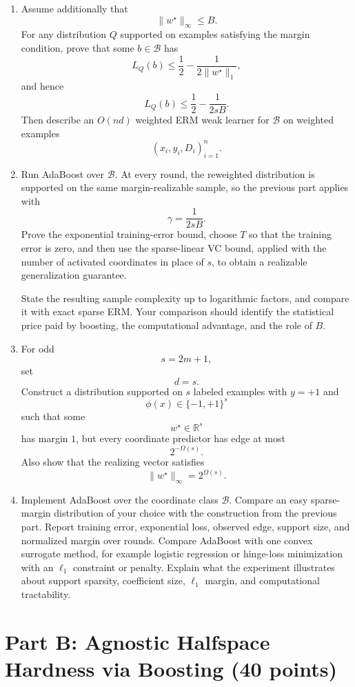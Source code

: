 \documentclass{article}
\begin{document}
\begin{enumerate}
\item Assume additionally that
$$
\|w^\star\|_\infty \le B.
$$
For any distribution $Q$ supported on examples satisfying the margin condition, prove that some $b\in\mathcal{B}$ has
$$
L_Q(b)\le \frac12-\frac{1}{2\|w^\star\|_1},
$$
and hence
$$
L_Q(b)\le \frac12-\frac{1}{2sB}.
$$
Then describe an $O(nd)$ weighted ERM weak learner for $\mathcal{B}$ on weighted examples
$$
(x_i,y_i,D_i)_{i=1}^n.
$$

\item Run AdaBoost over $\mathcal{B}$. At every round, the reweighted distribution is supported on the same margin-realizable sample, so the previous part applies with
$$
\gamma=\frac{1}{2sB}.
$$
Prove the exponential training-error bound, choose $T$ so that the training error is zero, and then use the sparse-linear VC bound, applied with the number of activated coordinates in place of $s$, to obtain a realizable generalization guarantee.

State the resulting sample complexity up to logarithmic factors, and compare it with exact sparse ERM. Your comparison should identify the statistical price paid by boosting, the computational advantage, and the role of $B$.

\item For odd
$$
s=2m+1,
$$
set
$$
d=s.
$$
Construct a distribution supported on $s$ labeled examples with $y=+1$ and
$$
\phi(x)\in\{-1,+1\}^s
$$
such that some
$$
w^\star\in\mathbb{R}^s
$$
has margin $1$, but every coordinate predictor has edge at most
$$
2^{-\Omega(s)}.
$$
Also show that the realizing vector satisfies
$$
\|w^\star\|_\infty = 2^{\Omega(s)}.
$$

\item Implement AdaBoost over the coordinate class $\mathcal{B}$. Compare an easy sparse-margin distribution of your choice with the construction from the previous part. Report training error, exponential loss, observed edge, support size, and normalized margin over rounds. Compare AdaBoost with one convex surrogate method, for example logistic regression or hinge-loss minimization with an $\ell_1$ constraint or penalty. Explain what the experiment illustrates about support sparsity, coefficient size, $\ell_1$ margin, and computational tractability.
\end{enumerate}

\section{Part B: Agnostic Halfspace Hardness via Boosting (40 points)}
\end{document}
